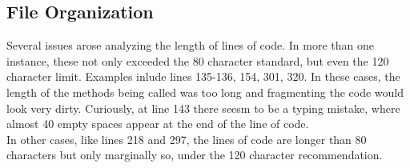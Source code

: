 \subsection{File Organization}

Several issues arose analyzing the length of lines of code. In more than one instance, these not only exceeded the 80 character standard, but even the 120 character limit. Examples inlude
lines 135-136, 154, 301, 320. In these cases, the length of the methods being called was too long and fragmenting the code would look very dirty. Curiously, at line 143 there seesm to be
a typing mistake, where almost 40 empty spaces appear at the end of the line of code. \\
In other cases, like lines 218 and 297, the lines of code are longer than 80 characters but only marginally so, under the 120 character recommendation. 